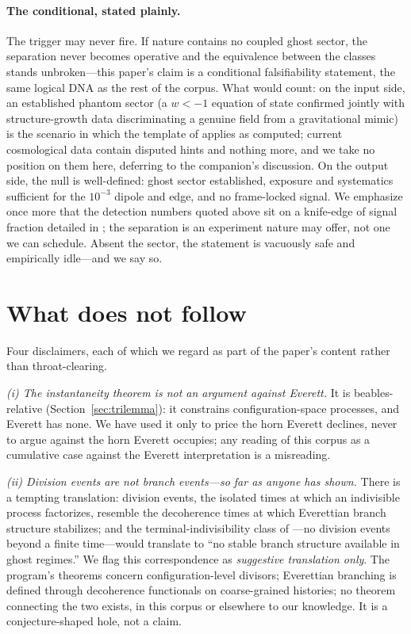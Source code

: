 \documentclass[11pt]{article}
\theoremstyle{remark}
\begin{document}
\paragraph{The conditional, stated plainly.} The trigger may never
fire. If nature contains no coupled ghost sector, the separation
never becomes operative and the equivalence between the classes
stands unbroken---this paper's claim is a conditional falsifiability
statement, the same logical DNA as the rest of the corpus. What would
count: on the input side, an established phantom sector (a
$w<-1$ equation of state confirmed jointly with structure-growth data
discriminating a genuine field from a gravitational mimic) is the
scenario in which the template of \cite{instantaneous} applies as
computed; current cosmological data contain disputed hints and
nothing more, and we take no position on them here, deferring to the
companion's discussion. On the output side, the null is well-defined:
ghost sector established, exposure and systematics sufficient for
the $10^{-3}$ dipole and edge, and no frame-locked signal. We
emphasize once more that the detection numbers quoted above sit on a
knife-edge of signal fraction detailed in \cite{instantaneous}; the
separation is an experiment nature may offer, not one we can
schedule. Absent the sector, the statement is vacuously safe and
empirically idle---and we say so.

\section{What does not follow}
\label{sec:limits}

Four disclaimers, each of which we regard as part of the paper's
content rather than throat-clearing.

\emph{(i) The instantaneity theorem is not an argument against
Everett.} It is beables-relative (Section~\ref{sec:trilemma}): it
constrains configuration-space processes, and Everett has none. We
have used it only to price the horn Everett declines, never to argue
against the horn Everett occupies; any reading of this corpus as a
cumulative case against the Everett interpretation is a misreading.

\emph{(ii) Division events are not branch events---so far as anyone
has shown.} There is a tempting translation: division events, the
isolated times at which an indivisible process factorizes, resemble
the decoherence times at which Everettian branch structure
stabilizes; and the terminal-indivisibility class of
\cite{indivisible}---no division events beyond a finite time---would
translate to ``no stable branch structure available in ghost
regimes.'' We flag this correspondence as \emph{suggestive
translation only}. The program's theorems concern
configuration-level divisors; Everettian branching is defined through
decoherence functionals on coarse-grained histories; no theorem
connecting the two exists, in this corpus or elsewhere to our
knowledge. It is a conjecture-shaped hole, not a claim.
\end{document}
